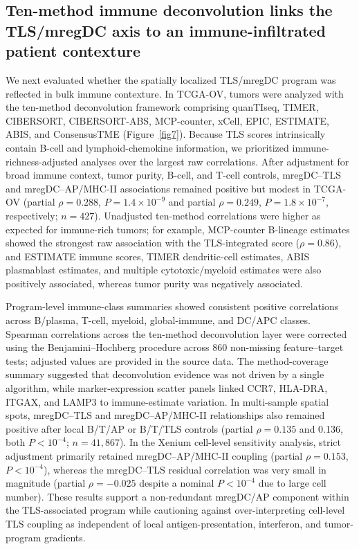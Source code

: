 \documentclass[pdflatex,sn-vancouver-num]{sn-jnl}
\begin{document}
\subsection{Ten-method immune deconvolution links the TLS/mregDC axis to an immune-infiltrated patient contexture}

We next evaluated whether the spatially localized TLS/mregDC program was reflected in bulk immune contexture. In TCGA-OV, tumors were analyzed with the ten-method deconvolution framework comprising quanTIseq, TIMER, CIBERSORT, CIBERSORT-ABS, MCP-counter, xCell, EPIC, ESTIMATE, ABIS, and ConsensusTME (Figure~\ref{fig7}). Because TLS scores intrinsically contain B-cell and lymphoid-chemokine information, we prioritized immune-richness-adjusted analyses over the largest raw correlations. After adjustment for broad immune context, tumor purity, B-cell, and T-cell controls, mregDC--TLS and mregDC--AP/MHC-II associations remained positive but modest in TCGA-OV (partial $\rho=0.288$, $P=1.4\times10^{-9}$ and partial $\rho=0.249$, $P=1.8\times10^{-7}$, respectively; $n=427$). Unadjusted ten-method correlations were higher as expected for immune-rich tumors; for example, MCP-counter B-lineage estimates showed the strongest raw association with the TLS-integrated score ($\rho=0.86$), and ESTIMATE immune scores, TIMER dendritic-cell estimates, ABIS plasmablast estimates, and multiple cytotoxic/myeloid estimates were also positively associated, whereas tumor purity was negatively associated.

Program-level immune-class summaries showed consistent positive correlations across B/plasma, T-cell, myeloid, global-immune, and DC/APC classes. Spearman correlations across the ten-method deconvolution layer were corrected using the Benjamini--Hochberg procedure across 860 non-missing feature--target tests; adjusted values are provided in the source data. The method-coverage summary suggested that deconvolution evidence was not driven by a single algorithm, while marker-expression scatter panels linked CCR7, HLA-DRA, ITGAX, and LAMP3 to immune-estimate variation. In multi-sample spatial spots, mregDC--TLS and mregDC--AP/MHC-II relationships also remained positive after local B/T/AP or B/T/TLS controls (partial $\rho=0.135$ and 0.136, both $P<10^{-4}$; $n=41{,}867$). In the Xenium cell-level sensitivity analysis, strict adjustment primarily retained mregDC--AP/MHC-II coupling (partial $\rho=0.153$, $P<10^{-4}$), whereas the mregDC--TLS residual correlation was very small in magnitude (partial $\rho=-0.025$ despite a nominal $P<10^{-4}$ due to large cell number). These results support a non-redundant mregDC/AP component within the TLS-associated program while cautioning against over-interpreting cell-level TLS coupling as independent of local antigen-presentation, interferon, and tumor-program gradients.
\end{document}
